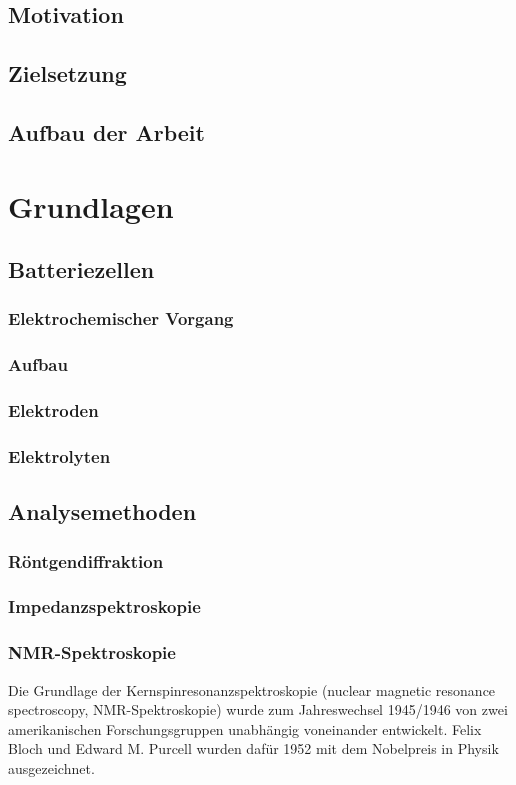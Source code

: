 \documentclass[a4paper, 11pt, headsepline,footsepline,twoside,abstract]{scrbook}
\begin{document}
\section{Motivation}
\section{Zielsetzung}
\section{Aufbau der Arbeit}
\chapter{Grundlagen}
\section{Batteriezellen}
\subsection{Elektrochemischer Vorgang}
\subsection{Aufbau}
\subsection{Elektroden}
\subsection{Elektrolyten}
\section{Analysemethoden}
\subsection{Röntgendiffraktion}
\subsection{Impedanzspektroskopie}
\subsection{NMR-Spektroskopie}
Die Grundlage der Kernspinresonanzspektroskopie (nuclear magnetic resonance spectroscopy, NMR-Spektroskopie) wurde zum Jahreswechsel 1945/1946 von zwei amerikanischen Forschungsgruppen unabhängig voneinander entwickelt. Felix Bloch und Edward M. Purcell wurden dafür 1952 mit dem Nobelpreis in Physik ausgezeichnet.
\\\\
\end{document}
